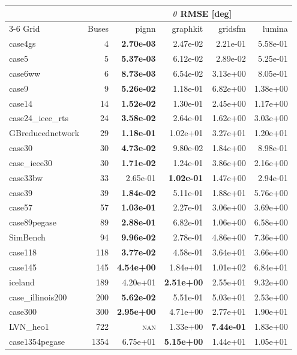 \documentclass[10pt]{article}
\begin{document}
\begin{table}[H]
\centering\small
\begin{tabular}{lr rrrr}
\toprule
 & & \multicolumn{4}{c}{$\theta$ RMSE [deg]} \\
\cmidrule(lr){3-6}
Grid & Buses & pignn & graphkit & gridsfm & lumina \\
\midrule
case4gs & 4 & \textbf{2.70e-03} & 2.47e-02 & 2.21e-01 & 5.58e-01 \\
case5 & 5 & \textbf{5.37e-03} & 6.12e-02 & 2.89e-02 & 5.25e-01 \\
case6ww & 6 & \textbf{8.73e-03} & 6.54e-02 & 3.13e+00 & 8.05e-01 \\
case9 & 9 & \textbf{5.26e-02} & 1.18e-01 & 6.82e+00 & 1.38e+00 \\
case14 & 14 & \textbf{1.52e-02} & 1.30e-01 & 2.45e+00 & 1.17e+00 \\
case24\_ieee\_rts & 24 & \textbf{3.58e-02} & 2.64e-01 & 1.62e+00 & 3.03e+00 \\
GBreducednetwork & 29 & \textbf{1.18e-01} & 1.02e+01 & 3.27e+01 & 1.20e+01 \\
case30 & 30 & \textbf{4.73e-02} & 9.80e-02 & 1.84e+00 & 8.98e-01 \\
case\_ieee30 & 30 & \textbf{1.71e-02} & 1.24e-01 & 3.86e+00 & 2.16e+00 \\
case33bw & 33 & 2.65e-01 & \textbf{1.02e-01} & 1.47e+00 & 2.94e-01 \\
case39 & 39 & \textbf{1.84e-02} & 5.11e-01 & 1.88e+01 & 5.76e+00 \\
case57 & 57 & \textbf{1.03e-01} & 2.27e-01 & 3.06e+00 & 3.69e+00 \\
case89pegase & 89 & \textbf{2.88e-01} & 6.82e-01 & 1.06e+00 & 6.58e+00 \\
SimBench & 94 & \textbf{9.96e-02} & 2.78e-01 & 4.86e+00 & 7.36e+00 \\
case118 & 118 & \textbf{3.77e-02} & 4.58e-01 & 3.64e+01 & 3.66e+00 \\
case145 & 145 & \textbf{4.54e+00} & 1.84e+01 & 1.01e+02 & 6.84e+01 \\
iceland & 189 & 4.20e+01 & \textbf{2.51e+00} & 2.55e+01 & 9.32e+00 \\
case\_illinois200 & 200 & \textbf{5.62e-02} & 5.51e-01 & 5.03e+01 & 2.53e+00 \\
case300 & 300 & \textbf{2.95e+00} & 4.71e+00 & 2.77e+01 & 1.90e+01 \\
LVN\_heo1 & 722 & \textsc{nan} & 1.33e+00 & \textbf{7.44e-01} & 1.83e+00 \\
case1354pegase & 1354 & 6.75e+01 & \textbf{5.15e+00} & 1.44e+01 & 1.05e+01 \\

\end{tabular}
\end{table}
\end{document}
